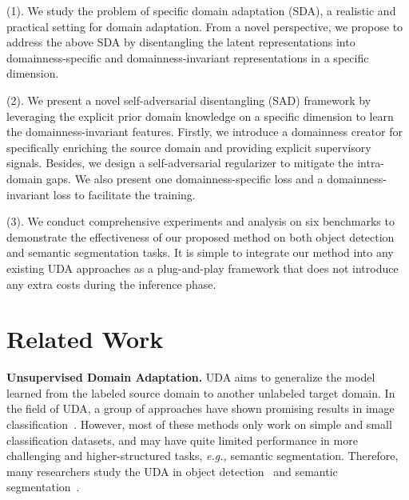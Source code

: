 \documentclass[10pt,journal,compsoc]{IEEEtran}
\begin{document}
(1). We study the problem of specific domain adaptation (SDA), a realistic and practical setting for domain adaptation. From a novel perspective, we propose to address the above SDA by disentangling the latent representations into domainness-specific and domainness-invariant representations in a specific dimension. 


(2). We present a novel self-adversarial disentangling (SAD) framework by leveraging the explicit prior domain knowledge on a specific dimension to learn the domainness-invariant features. Firstly, we introduce a domainness creator for specifically enriching the source domain and providing explicit supervisory signals. Besides, we design a self-adversarial regularizer to mitigate the intra-domain gaps. We also present one domainness-specific loss and a domainness-invariant loss to facilitate the training. 



(3). We conduct comprehensive experiments and analysis on six benchmarks to demonstrate the effectiveness of our proposed method on both object detection and semantic segmentation tasks. It is simple to integrate our method into any existing UDA approaches as a plug-and-play framework that does not introduce any extra costs during the inference phase. 




\section{Related Work}
\noindent \textbf{Unsupervised Domain Adaptation.} UDA aims to generalize the model learned from the labeled source domain to another unlabeled target domain. In the field of UDA, a group of approaches have shown promising results in image classification~\cite{zhang2020unsupervised, mancini2019inferring, kouw2019review, 8943120, li2020deep, li2020maximum, rozantsev2018beyond, liang2018aggregating, li2017domain, ghifary2016scatter, courty2016optimal, DANN}. However, most of these methods only work on simple and small classification datasets, and may have quite limited performance in more challenging and higher-structured tasks, \emph{e.g.,} semantic segmentation. Therefore, many researchers study the UDA in object detection~\cite{DA-Faster-RCNN,SWDA,MAF,SCDA,GPA,HTCN,ICR-CCR,SCL,hsu2020every,ATF,sindagi2019prior,zhao2020collaborative,ART-PCA,PIT} and semantic segmentation~\cite{ASA,CLANv2,CyCADA, AdaptSegNet,BDL,LTIR,CLAN,SIM, DISE,FDA,STAR,PCEDA,IntraDA,APODA,FADA,DADA,choi2019self,SIBAN,CRST,CBST,Conservative_loss,AdaptPatch,zhang2019curriculum, luo2021category, sakaridis2020map}.
\end{document}
